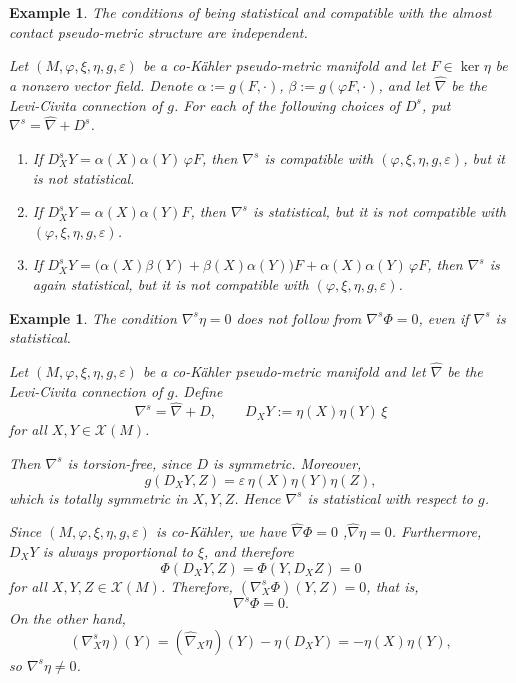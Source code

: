 \documentclass[12pt,a4paper,final]{amsart}
\numberwithin{equation}{section}
\theoremstyle{df}
\newtheorem{ex}[tw]{Example}
\newcommand{\X}{\mathcal{X}}
\newcommand{\XM}{\X(M)}
\newcommand{\eps}{\varepsilon}
\begin{document}
\begin{ex}\label{ex::independent}
The conditions of being statistical and compatible with the almost contact
pseudo-metric structure are independent.
\par Let $(M,\varphi,\xi,\eta,g,\eps)$ be a co-K\"ahler pseudo-metric manifold and
let $F\in\ker\eta$ be a nonzero vector field. Denote
$\alpha:=g(F,\cdot)$, $\beta:=g(\varphi F,\cdot)$,
and let $\widehat{\nabla}$ be the Levi-Civita connection of $g$.
For each of the following choices of $D^s$, put $\nabla^s=\widehat{\nabla}+D^s$.
\begin{enumerate}
\item
If $D^s_XY=\alpha(X)\alpha(Y)\,\varphi F$, then $\nabla^s$ is compatible with $(\varphi,\xi,\eta,g,\eps)$, but it is not statistical.
\item
If $D^s_XY=\alpha(X)\alpha(Y)F$, then $\nabla^s$ is statistical, but it is not compatible with $(\varphi,\xi,\eta,g,\eps)$.
\item
If $D^s_XY=\bigl(\alpha(X)\beta(Y)+\beta(X)\alpha(Y)\bigr)F+\alpha(X)\alpha(Y)\,\varphi F$,
then $\nabla^s$ is again statistical, but it is not compatible with $(\varphi,\xi,\eta,g,\eps)$.
\end{enumerate}
\end{ex}


\begin{ex}\label{ex::eta::needed}
The condition $\nabla^s\eta=0$ does not follow from $\nabla^s\Phi=0$, even if $\nabla^s$ is statistical.
\par Let $(M,\varphi,\xi,\eta,g,\eps)$ be a co-K\"ahler pseudo-metric manifold and
let $\widehat{\nabla}$ be the Levi-Civita connection of $g$. Define
$$
\nabla^s=\widehat{\nabla}+D,\qquad D_XY:=\eta(X)\eta(Y)\,\xi
$$
for all $X,Y\in\XM$.
\par Then $\nabla^s$ is torsion-free, since $D$ is symmetric. Moreover,
$$
g(D_XY,Z)=\eps\,\eta(X)\eta(Y)\eta(Z),
$$
which is totally symmetric in $X,Y,Z$. Hence $\nabla^s$ is statistical with
respect to $g$.
\par Since $(M,\varphi,\xi,\eta,g,\eps)$ is co-K\"ahler, we have
$\widehat{\nabla}\Phi=0$ ,$\widehat{\nabla}\eta=0$.
Furthermore, $D_XY$ is always proportional to $\xi$, and therefore
$$
\Phi(D_XY,Z)=\Phi(Y,D_XZ)=0
$$
for all $X,Y,Z\in\XM$. Therefore, $(\nabla^s_X\Phi)(Y,Z)=0$, that is,
$$
\nabla^s\Phi=0.
$$
On the other hand,
$$
(\nabla^s_X\eta)(Y)=(\widehat{\nabla}_X\eta)(Y)-\eta(D_XY)=-\eta(X)\eta(Y),
$$
so $\nabla^s\eta\neq 0$.
\end{ex}
\end{document}
